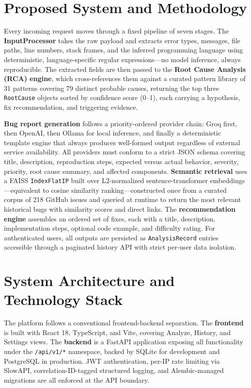 \documentclass[12pt,a4paper]{article}
\begin{document}
\section{Proposed System and Methodology}

Every incoming request moves through a fixed pipeline of seven stages. The \textbf{InputProcessor} takes the raw payload and extracts error types, messages, file paths, line numbers, stack frames, and the inferred programming language using deterministic, language-specific regular expressions---no model inference, always reproducible. The extracted fields are then passed to the \textbf{Root Cause Analysis (RCA) engine}, which cross-references them against a curated pattern library of 31 patterns covering 79 distinct probable causes, returning the top three \texttt{RootCause} objects sorted by confidence score (0--1), each carrying a hypothesis, fix recommendation, and triggering evidence.

\textbf{Bug report generation} follows a priority-ordered provider chain: Groq first, then OpenAI, then Ollama for local inference, and finally a deterministic template engine that always produces well-formed output regardless of external service availability. All providers must conform to a strict JSON schema covering title, description, reproduction steps, expected versus actual behavior, severity, priority, root cause summary, and affected components. \textbf{Semantic retrieval} uses a FAISS \texttt{IndexFlatIP} built over L2-normalized sentence-transformer embeddings---equivalent to cosine similarity ranking---constructed once from a curated corpus of 218 GitHub issues and queried at runtime to return the most relevant historical bugs with similarity scores and direct links. The \textbf{recommendation engine} assembles an ordered set of fixes, each with a title, description, implementation steps, optional code example, and difficulty rating. For authenticated users, all outputs are persisted as \texttt{AnalysisRecord} entries accessible through a paginated history API with strict per-user data isolation.

\section{System Architecture and Technology Stack}

The platform follows a conventional frontend-backend separation. The \textbf{frontend} is built with React 18, TypeScript, and Vite, covering Analyze, History, and Settings views. The \textbf{backend} is a FastAPI application exposing all functionality under the \texttt{/api/v1/*} namespace, backed by SQLite for development and PostgreSQL in production. JWT authentication, per-IP rate limiting via SlowAPI, correlation-ID-tagged structured logging, and Alembic-managed migrations are all enforced at the API boundary.
\end{document}
